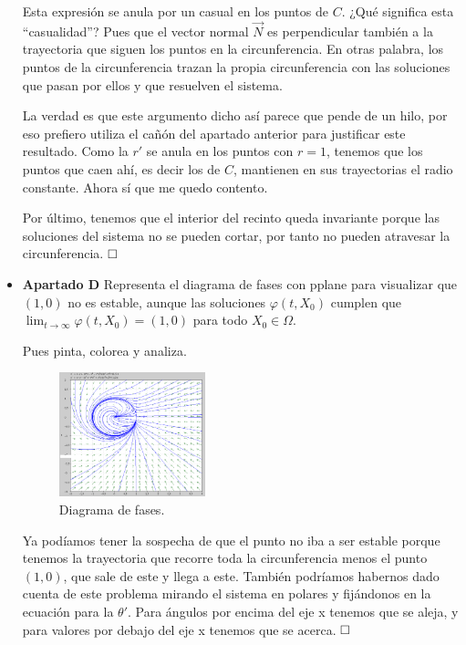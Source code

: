 \documentclass[spanish, a4paper, 12pt] {article}
\begin{document}
\begin{itemize}
{Esta expresión se anula por un casual en los puntos de $C$. ¿Qué significa esta ``casualidad''? Pues que el vector normal $\vec{N}$ es perpendicular también a la trayectoria que siguen los puntos en la circunferencia. En otras palabra, los puntos de la circunferencia trazan la propia circunferencia con las soluciones que pasan por ellos y que resuelven el sistema.

La verdad es que este argumento dicho así parece que pende de un hilo, por eso prefiero utiliza el cañón del apartado anterior para justificar este resultado. Como la $r'$ se anula en los puntos con $r = 1$, tenemos que los puntos que caen ahí, es decir los de $C$, mantienen en sus trayectorias el radio constante. Ahora sí que me quedo contento.

Por último, tenemos que el interior del recinto queda invariante porque las soluciones del sistema no se pueden cortar, por tanto no pueden atravesar la circunferencia.
$\hfill \square$
}
\item{
\textbf{Apartado D} Representa el diagrama de fases con pplane para visualizar que $(1, 0)$ no es estable, aunque las soluciones $\varphi(t, X_0)$ cumplen que $\lim_{t\rightarrow\infty}\varphi(t, X_0) = (1,0)$ para todo $X_0 \in \Omega$.

Pues pinta, colorea y analiza.

{\begin{figure}[!ht]
\centering
\includegraphics[width=0.4\textwidth]{plot.png}
\caption{Diagrama de fases.}
\end{figure}}

Ya podíamos tener la sospecha de que el punto no iba a ser estable porque tenemos la trayectoria que recorre toda la circunferencia menos el punto $(1,0)$, que sale de este y llega a este. También podríamos habernos dado cuenta de este problema mirando el sistema en polares y fijándonos en la ecuación para la $\theta'$. Para ángulos por encima del eje x tenemos que se aleja, y para valores por debajo del eje x tenemos que se acerca.
$\hfill \square$
}
\end{itemize}
\end{document}
